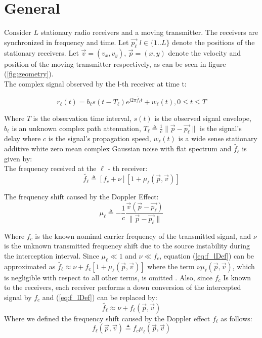 \documentclass[10pt,a4paper]{report}
\begin{document}
\section{General}
Consider $L$ stationary radio receivers and a moving transmitter. The receivers are synchronized in frequency and time. Let  $\vec{p_\ell}$ $l\in{\{1..L\}}$ denote the positions of the stationary receivers. Let $\vec{v}=(v_x,v_y)$, $\vec{p}=(x,y)$ denote the velocity and position of the moving transmitter respectively, as can be seen in figure (\ref{fig:geometry}).\\

The complex signal observed by the l-th receiver at time t:

\begin{equation}
\label{eq:r_lDef}
r_\ell(t)=b_\ell s(t-T_\ell )e^{j2\pi \tilde{f_\ell} t}+w_\ell(t),  0\leq t\leq T                                              
\end{equation}

Where $T$ is the observation time interval, $s(t)$ is the observed signal envelope, $b_\ell$ is an unknown complex path attenuation, $T_\ell \triangleq \frac{1}{c}\|\vec{p} -\vec{p_\ell}\|$ is the signal's delay where $c$ is the signal's propagation speed, $w_\ell (t)$ is a wide sense stationary additive white zero mean complex Gaussian noise with flat spectrum and $\tilde{f_\ell}$ is given by:\\

The frequency received at the $\ell$ - th receiver: 
\begin{equation}
\label{eq:f_lDef}
\tilde{f_\ell}\triangleq[f_c+\nu][1+\mu_\ell (\vec{p} ,\vec{v})]                 
\end{equation}

 The frequency shift caused by the Doppler Effect:
\begin{equation} 
\mu_\ell \triangleq -\frac{1}{c} \frac{\vec{v}(\vec{p}-\vec{p_\ell})}{\|\vec{p}-\vec{p_\ell}\|}                             
\end{equation}

Where  $f_c$ is the known nominal carrier frequency of the transmitted signal, and $\nu$ is the unknown transmitted frequency shift due to the source instability during the interception interval.
Since $\mu_\ell \ll 1$ and $\nu \ll f_c$, equation (\ref{eq:f_lDef}) can be approximated as $\tilde{f_\ell}\approx \nu+f_c [1+\mu_\ell (\vec{p},\vec{v})]$ where the term $\nu\mu_\ell (\vec{p},\vec{v})$, which is negligible with respect to all other terms, is omitted . Also, since $f_c$ Is known to the receivers, each receiver performs a down conversion of the intercepted signal by $f_c$ and (\ref{eq:f_lDef}) can be replaced by:
\begin{equation}
\label{eq:tildef_lapprox}
\tilde{f_\ell} \approx \nu+ f_\ell (\vec{p},\vec{v})                                                                      
\end{equation}
Where we defined the frequency shift caused by the Doppler effect $f_\ell$ as follows:
\begin{equation}
f_\ell(\vec{p},\vec{v}) \triangleq f_c \mu_\ell(\vec{p},\vec{v})
\end{equation}
\end{document}
